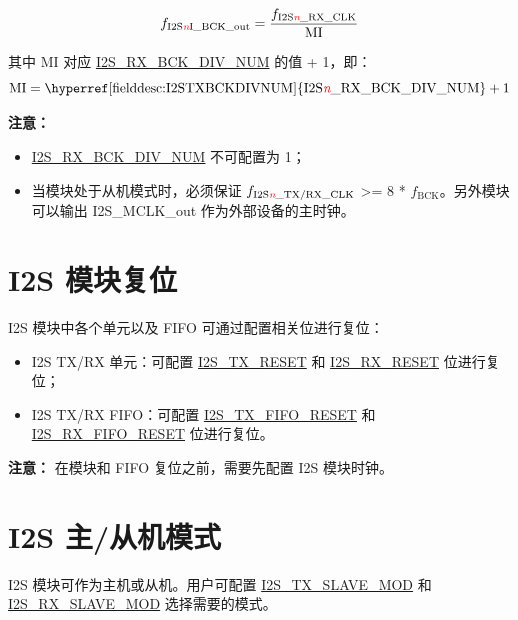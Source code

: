 \documentclass[main\_\_CN.tex]{subfiles}
\begin{document}
$$f_{\textrm{I2S\textcolor{red}{\it{n}}I\_BCK\_out}} = \frac{f_{\textrm{I2S\textcolor{red}{\it{n}}\_RX\_CLK}}}{\textrm{MI}}$$

其中 MI 对应 \hyperref[fielddesc:I2SRXBCKDIVNUM]{I2S\_RX\_BCK\_DIV\_NUM} 的值 + 1，即：
$$ \textrm{MI} = \textrm{\hyperref[fielddesc:I2STXBCKDIVNUM]{I2S\regindex{n}\_RX\_BCK\_DIV\_NUM}} + 1 $$


{\bfseries 注意：}
\begin{itemize}
    \item \hyperref[fielddesc:I2SRXBCKDIVNUM]{I2S\_RX\_BCK\_DIV\_NUM} 不可配置为 1；
    \item 当模块处于从机模式时，必须保证 $f_{\textrm{I2S\textcolor{red}{\it{n}}\_TX/RX\_CLK}}$ >= 8 * $f_{\textrm{BCK}}$。另外模块可以输出 I2S\_MCLK\_out 作为外部设备的主时钟。

\end{itemize}

\section{I2S 模块复位} \label{i2s_module_reset}

I2S 模块中各个单元以及 FIFO 可通过配置相关位进行复位：
\begin{itemize}
\item I2S TX/RX 单元：可配置 \hyperref[fielddesc:I2STXRESET]{I2S\_TX\_RESET} 和 \hyperref[fielddesc:I2SRXRESET]{I2S\_RX\_RESET} 位进行复位；
\item I2S TX/RX FIFO：可配置 \hyperref[fielddesc:I2STXFIFORESET]{I2S\_TX\_FIFO\_RESET} 和 \hyperref[fielddesc:I2SRXFIFORESET]{I2S\_RX\_FIFO\_RESET} 位进行复位。
\end{itemize}


{\bfseries 注意：}
在模块和 FIFO 复位之前，需要先配置 I2S 模块时钟。


\section{I2S 主/从机模式}

\chipname{} I2S 模块可作为主机或从机。用户可配置  \hyperref[fielddesc:I2STXSLAVEMOD]{I2S\_TX\_SLAVE\_MOD} 和 \hyperref[fielddesc:I2SRXSLAVEMOD]{I2S\_RX\_SLAVE\_MOD} 选择需要的模式。
\end{document}
